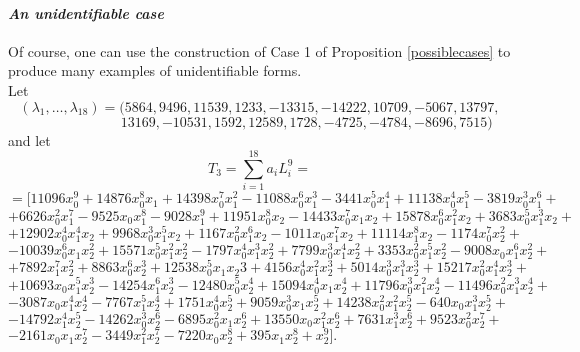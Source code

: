 \documentclass{amsart}
\theoremstyle{definition}
\begin{document}
\paragraph{\textit{An unidentifiable case}}  
Of course, one can use the construction of Case 1 of Proposition \ref{possiblecases} to produce many examples 
of unidentifiable forms.\\
Let {\small{$$ (\lambda_{1}, \ldots, \lambda_{18}) = (5864,9496,11539,1233,-13315,-14222,10709, -5067, 13797,$$
$$ \quad\quad\quad\quad\quad\quad\,\,\,\, 13169,-10531,1592,12589,1728,-4725,-4784,-8696,7515) $$}}
and let
$$ T_{3} = \sum_{i=1}^{18}a_{i} L_{i}^{9} = $$
{\small{$$ = [11096x_{0}^9+14876x_{0}^8x_{1}+14398x_{0}^7x_{1}^2-11088x_{0}^6x_{1}^3-3441x_{0}^5x_{1}^4+11138x_{0}^4x_{1}^5-3819x_{0}^3x_{1}^6+$$
$$+6626x_{0}^2x_{1}^7-9525x_{0}x_{1}^8-9028x_{1}^9+11951x_{0}^8x_{2}-14433x_{0}^7x_{1}x_{2}+15878x_{0}^6x_{1}^2x_{2}+3683x_{0}^5x_{1}^3x_{2}+$$
$$+12902x_{0}^4x_{1}^4x_{2}+9968x_{0}^3x_{1}^5x_{2}+1167x_{0}^2x_{1}^6x_{2}-1011x_{0}x_{1}^7x_{2}+11114x_{1}^8x_{2}-1174x_{0}^7x_{2}^2+\quad\quad$$
$$-10039x_{0}^6x_{1}x_{2}^2+15571x_{0}^5x_{1}^2x_{2}^2-1797x_{0}^4x_{1}^3x_{2}^2+7799x_{0}^3x_{1}^4x_{2}^2+3353x_{0}^2x_{1}^5x_{2}^2-9008x_{0}x_{1}^6x_{2}^2+$$
$$+7892x_{1}^7x_{2}^2+8863x_{0}^6x_{2}^3+12538x_{0}^5x_{1}x_{2}3+4156x_{0}^4x_{1}^2x_{2}^3+5014x_{0}^3x_{1}^3x_{2}^3+15217x_{0}^2x_{1}^4x_{2}^3+\quad\,\,\,$$
$$+10693x_{0}x_{1}^5x_{2}^3-14254x_{1}^6x_{2}^3-12480x_{0}^5x_{2}^4+15094x_{0}^4x_{1}x_{2}^4+11796x_{0}^3x_{1}^2x_{2}^4-11496x_{0}^2x_{1}^3x_{2}^4+$$
$$-3087x_{0}x_{1}^4x_{2}^4-7767x_{1}^5x_{2}^4+1751x_{0}^4x_{2}^5+9059x_{0}^3x_{1}x_{2}^5+14238x_{0}^2x_{1}^2x_{2}^5-640x_{0}x_{1}^3x_{2}^5+\quad\quad\quad$$
$$-14792x_{1}^4x_{2}^5-14262x_{0}^3x_{2}^6-6895x_{0}^2x_{1}x_{2}^6+13550x_{0}x_{1}^2x_{2}^6+7631x_{1}^3x_{2}^6+9523x_{0}^2x_{2}^7+\quad\quad\quad\quad$$
$$-2161x_{0}x_{1}x_{2}^7-3449x_{1}^2x_{2}^7-7220x_{0}x_{2}^8+395x_{1}x_{2}^8+x_{2}^9].\quad\quad\quad\quad\quad\quad \quad\quad\quad\quad\quad\quad \quad\quad\quad   $$}}
\end{document}
